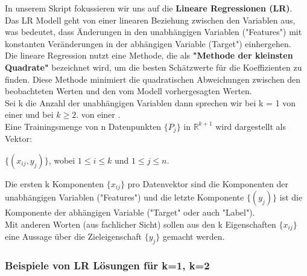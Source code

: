 \documentclass[12pt]{article}
\begin{document}
In unserem Skript fokussieren wir uns auf die \textbf{Lineare Regressionen (LR)}.
Das LR Modell geht von einer linearen Beziehung zwischen den Variablen aus, was bedeutet, dass Änderungen in den unabhängigen Variablen ("Features") mit konstanten Veränderungen in der abhängigen Variable (Target") einhergehen.\\
Die lineare Regression nutzt eine Methode, die als \textbf{"Methode der kleinsten Quadrate"} bezeichnet wird, um die besten Schätzwerte für die Koeffizienten zu finden. Diese Methode minimiert die quadratischen Abweichungen zwischen den beobachteten Werten und den vom Modell vorhergesagten Werten. \\
Sei k die Anzahl der unabhängigen Variablen dann sprechen wir bei k = 1 von einer {\color{blue}{"Einfachen (simple) Linearen Regression" (sLR)}} und bei $k\geqslant 2.$ von einer {\color{blue}{"Multidimensionalen (multiplen) Linearen Regression"(mLR)}}.\\
Eine Trainingsmenge von n Datenpunkten $\lbrace P_j \rbrace$ in $\mathbb{R}^{k+1} $ wird dargestellt als Vektor: 
\begin{center}
$ \lbrace(x_{ij},y_j) \rbrace$,  wobei $1 \leq i \leq k $ und $1 \leq j \leq n $.\\
\end{center} 
Die ersten k Komponenten $\lbrace x_{ij} \rbrace $ pro Datenvektor sind die Komponenten der unabhängigen Variablen ("Features") und die letzte Komponente $ \lbrace(y_j)\rbrace $ ist die Komponente der abhängigen Variable ("Target" oder auch "Label").\\  Mit anderen Worten (aus fachlicher Sicht) sollen aus den k Eigenschaften $\lbrace x_{ij} \rbrace$ eine Aussage über die Zieleigenschaft $\lbrace y_j \rbrace$ gemacht werden.   

\subsubsection{Beispiele von LR Lösungen für k=1, k=2}
\end{document}
